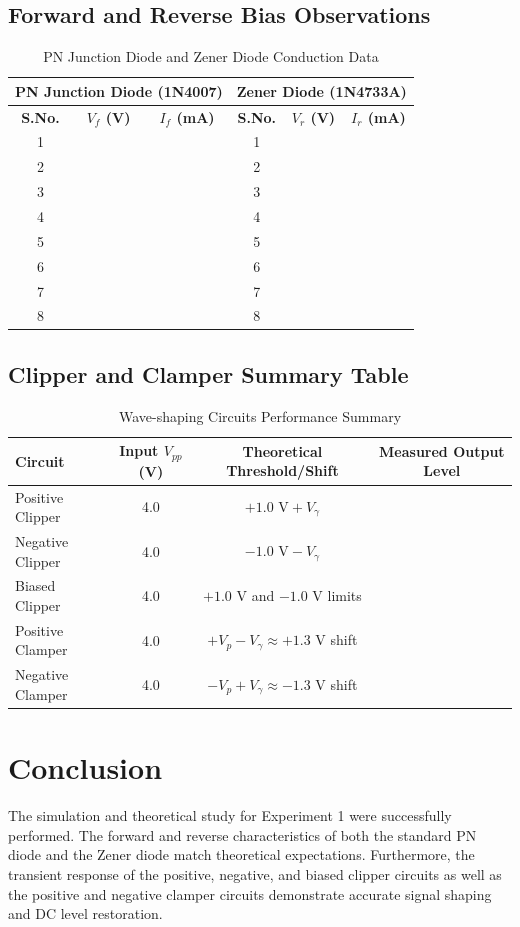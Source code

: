 \documentclass[11pt,a4paper]{article}
\begin{document}
\subsection{Forward and Reverse Bias Observations}
\begin{table}[H]
\centering
\caption{PN Junction Diode and Zener Diode Conduction Data}
\begin{tabular}{c c c | c c c}
\toprule
\multicolumn{3}{c|}{\textbf{PN Junction Diode (1N4007)}} & \multicolumn{3}{c}{\textbf{Zener Diode (1N4733A)}} \\
\midrule
\textbf{S.No.} & \textbf{$V_f$ (V)} & \textbf{$I_f$ (mA)} & \textbf{S.No.} & \textbf{$V_r$ (V)} & \textbf{$I_r$ (mA)} \\
\midrule
1 & & & 1 & & \\
2 & & & 2 & & \\
3 & & & 3 & & \\
4 & & & 4 & & \\
5 & & & 5 & & \\
6 & & & 6 & & \\
7 & & & 7 & & \\
8 & & & 8 & & \\
\bottomrule
\end{tabular}
\end{table}

\subsection{Clipper and Clamper Summary Table}
\begin{table}[H]
\centering
\caption{Wave-shaping Circuits Performance Summary}
\begin{tabular}{l c c c}
\toprule
\textbf{Circuit} & \textbf{Input $V_{pp}$ (V)} & \textbf{Theoretical Threshold/Shift} & \textbf{Measured Output Level} \\
\midrule
Positive Clipper & 4.0 & $+1.0\text{ V} + V_\gamma$ & \\
Negative Clipper & 4.0 & $-1.0\text{ V} - V_\gamma$ & \\
Biased Clipper   & 4.0 & $+1.0\text{ V}$ and $-1.0\text{ V}$ limits & \\
Positive Clamper & 4.0 & $+V_p - V_\gamma \approx +1.3\text{ V}$ shift & \\
Negative Clamper & 4.0 & $-V_p + V_\gamma \approx -1.3\text{ V}$ shift & \\
\bottomrule
\end{tabular}
\end{table}

\section{Conclusion}
The simulation and theoretical study for Experiment 1 were successfully performed. The forward and reverse characteristics of both the standard PN diode and the Zener diode match theoretical expectations. Furthermore, the transient response of the positive, negative, and biased clipper circuits as well as the positive and negative clamper circuits demonstrate accurate signal shaping and DC level restoration.
\end{document}

